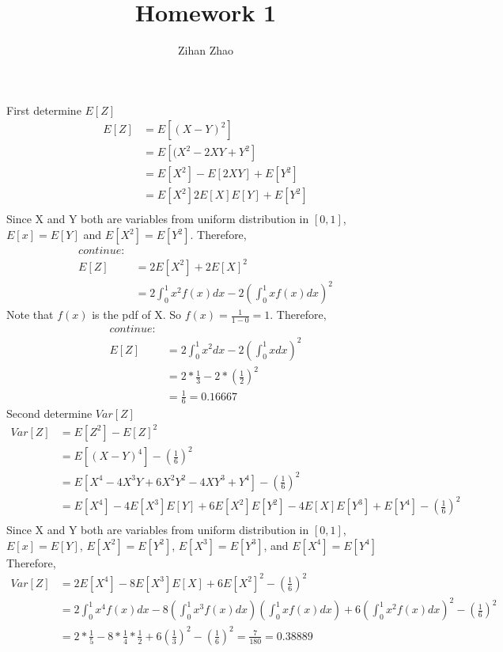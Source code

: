 \documentclass{article}
\author{Zihan Zhao}
\affil{1001103708}
\title{Homework 1}
\date{}
\begin{document}
\maketitle
\section{}
\renewcommand{\thesubsection}{(\alph{subsection})}
\subsection{}
First determine $E[Z]$
\begin{align*}
  E[Z] &= E[(X-Y)^2]\\
  &= E[(X^2 - 2XY + Y^2]\\
  &= E[X^2] - E[2XY] + E[Y^2]\\
  &= E[X^2]  2E[X]E[Y] + E[Y^2]\\
\end{align*}
Since X and Y both are variables from uniform distribution in $[0,1]$, $E[x] = E[Y]$ and $E[X^2] = E[Y^2]$. Therefore,
\begin{align*}
    continue:\\
    E[Z] &= 2E[X^2] + 2E[X]^2\\
    &= 2\int^1_0 x^2f(x)dx - 2(\int^1_0 xf(x)dx)^2
\end{align*}
Note that $f(x)$ is the pdf of X. So $f(x) = \frac{1}{1-0} = 1$. Therefore,
\begin{align*}
    continue:\\
    E[Z] &= 2\int^1_0 x^2dx - 2(\int^1_0 xdx)^2\\
    &= 2*\frac{1}{3} - 2*(\frac{1}{2})^2\\
    &= \frac{1}{6} = 0.16667
\end{align*}
Second determine $Var[Z]$
\begin{align*}
    Var[Z] &= E[Z^2]-E[Z]^2\\
    &= E[(X-Y)^4]-(\frac{1}{6})^2\\
    &= E[X^4-4X^3Y+6X^2Y^2-4XY^3+Y^4]-(\frac{1}{6})^2\\
    &= E[X^4]-4E[X^3]E[Y]+6E[X^2]E[Y^2]-4E[X]E[Y^3]+E[Y^4]-(\frac{1}{6})^2\\
\end{align*}
Since X and Y both are variables from uniform distribution in $[0,1]$, $E[x] = E[Y]$, $E[X^2] = E[Y^2]$, $E[X^3] = E[Y^3]$, and $E[X^4] = E[Y^4]$ Therefore,
\begin{align*}
    Var[Z] &= 2E[X^4]-8E[X^3]E[X]+6E[X^2]^2-(\frac{1}{6})^2\\
    &= 2\int^1_0 x^4f(x)dx - 8(\int^1_0 x^3f(x)dx)(\int^1_0 xf(x)dx) + 6(\int^1_0 x^2f(x)dx)^2-(\frac{1}{6})^2\\
    &= 2*\frac{1}{5} - 8*\frac{1}{4}*\frac{1}{2} + 6(\frac{1}{3})^2-(\frac{1}{6})^2=\frac{7}{180}=0.38889
\end{align*}
\end{document}
